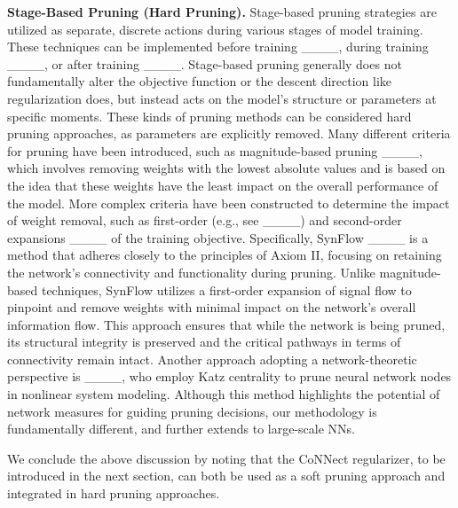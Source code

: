 \textbf{Stage-Based Pruning (Hard Pruning).}
Stage-based pruning strategies are utilized as separate, discrete actions during various stages of model training. These techniques can be implemented before training ____, during training ____, or after training ____.
Stage-based pruning generally does not fundamentally alter the objective function or the descent direction like regularization does, but instead acts on the model’s structure or parameters at specific moments.
These kinds of pruning methods can be considered hard pruning approaches, as parameters are explicitly removed.
Many different criteria for pruning have been introduced, such as magnitude-based pruning ____, which involves removing weights with the lowest absolute values and is based on the idea that these weights have the least impact on the overall performance of the model.
More complex criteria have been constructed to determine the impact of weight removal, such as first-order (e.g., see ____) and second-order expansions ____ of the training objective.
Specifically, SynFlow ____ is a method that adheres closely to the principles of Axiom II, focusing on retaining the network's connectivity and functionality during pruning. 
Unlike magnitude-based techniques, SynFlow utilizes a first-order expansion of signal flow to pinpoint and remove weights with minimal impact on the network's overall information flow. 
This approach ensures that while the network is being pruned, its structural integrity is preserved and the critical pathways in terms of connectivity remain intact.
Another approach adopting a network-theoretic perspective is ____, who employ Katz centrality to prune neural network nodes in nonlinear system modeling. Although this method highlights the potential of network measures for guiding pruning decisions, our methodology is fundamentally different, and further extends to large-scale NNs.



We conclude the above discussion by noting that the CoNNect regularizer, to be introduced in the next section, can both be used as a soft pruning approach and integrated in hard pruning approaches.
